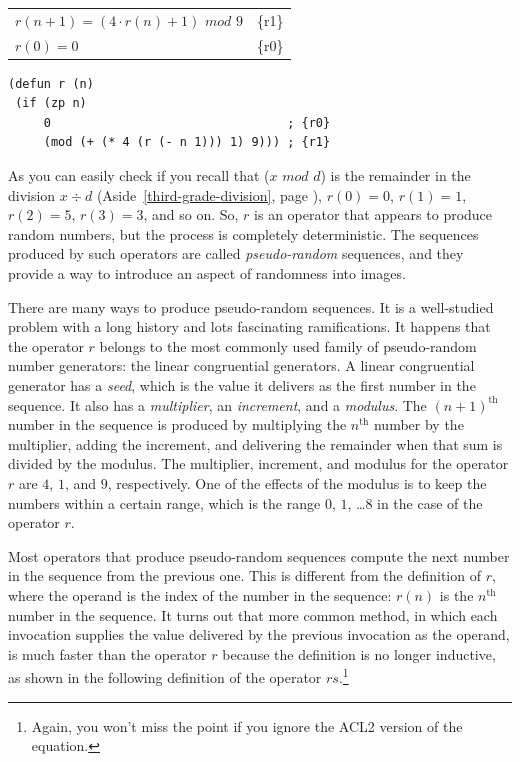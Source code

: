 \begin{center}
\begin{tabular}{ll}
$r(n+1) = (4\cdot r(n) + 1)$ $mod$ $9$ & \{r1\}\\
$r(0) = 0$                        & \{r0\}\\
\end{tabular}
\end{center}

\begin{Verbatim}
(defun r (n)
 (if (zp n)
     0                                 ; {r0}
     (mod (+ (* 4 (r (- n 1))) 1) 9))) ; {r1}
\end{Verbatim}

As you can easily check if you
recall that ($x$ $mod$ $d$) is the remainder in
the division $x \div d$
(Aside~\ref{third-grade-division}, page \pageref{third-grade-division}),
$r(0) = 0$, $r(1) = 1$, $r(2
) = 5$, $r(3) = 3$,
and so on.
So, $r$ is an operator that appears to produce random
numbers, but the process is completely deterministic.
The sequences produced by such operators
are called \emph{pseudo-random}
sequences,
and they provide a way to introduce an aspect of randomness into images.

There are many ways to produce pseudo-random sequences.
It is a well-studied problem with a long history and lots
fascinating ramifications. It happens that the operator
$r$ belongs to the most commonly used
family of pseudo-random number generators: the
linear congruential generators.
A linear congruential generator has a \emph{seed}, which is
the value it delivers as the first number in the sequence.
It also has a \emph{multiplier}, an \emph{increment}, and a \emph{modulus}.
The $(n+1)^\text{th}$ number in the sequence
is produced by multiplying the $n^\text{th}$ number by
the multiplier, adding the increment, and delivering
the remainder when that sum is divided by the modulus.
The multiplier, increment, and modulus for the operator $r$
are $4$, $1$, and $9$, respectively.
One of the effects of the modulus is to keep the numbers
within a certain range, which is the range $0$, $1$, \dots $8$ in
the case of the operator $r$.

Most operators that produce pseudo-random sequences
compute the next number in the sequence from the previous one.
This is different from the definition of $r$, where the
operand is the index of the number in the sequence: $r(n)$ is the
$n^\text{th}$ number in the sequence.
It turns out that more common method,
in which each invocation
supplies the value delivered by the previous invocation as
the operand, is much faster than
the operator $r$
because the definition is no longer inductive,
as shown in the following definition of the operator
$rs$.\footnote{Again, you won't miss the point
if you ignore the ACL2 version of the equation.}


